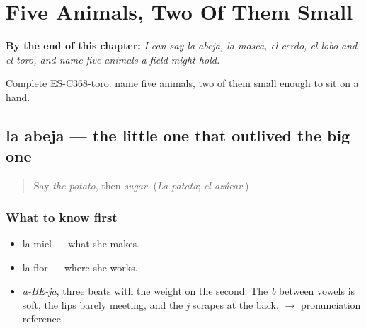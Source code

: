 
\chapter{Five Animals, Two Of Them Small}
\label{ch:la-abeja-y-la-mosca}

\begin{chapteropening}
\textbf{By the end of this chapter:} \emph{I can say la abeja, la mosca, el cerdo, el lobo and el toro, and name five animals a field might hold.}

Complete ES-C368-toro: name five animals, two of them small enough to sit on a hand.
\end{chapteropening}

\section[la abeja]{la abeja — the little one that outlived the big one}

\label{lesson:ES-C368-abeja}



\begin{quote}
Say \emph{the potato}, then \emph{sugar}. (\emph{La patata}; \emph{el azúcar}.)
\end{quote}

\subsection*{What to know first}
\begin{itemize}
\raggedright
  \item la miel — what she makes.
  \item la flor — where she works.
\end{itemize}

\begin{sounds}
\begin{itemize}
\raggedright
  \item \emph{a-BE-ja}, three beats with the weight on the second. The \emph{b} between vowels is soft, the lips barely meeting, and the \emph{j} scrapes at the back. $\to$ pronunciation reference
\end{itemize}
\end{sounds}

